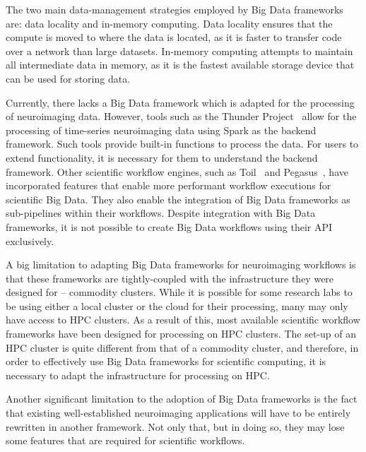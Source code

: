         The two main data-management strategies employed by Big Data frameworks
        are: data locality and in-memory computing. Data locality ensures that
        the compute is moved to where the data is located, as it is faster to
        transfer code over a network than large datasets. In-memory computing attempts
        to maintain all intermediate data in memory, as it is the fastest available storage
        device that can be used for storing data.

        Currently, there lacks a Big Data framework which is adapted for the
        processing of neuroimaging data. However, tools such as the Thunder 
        Project~\cite{Freeman:2014aa} allow for the processing of time-series
        neuroimaging data using Spark as the backend framework. Such tools
        provide built-in functions to process the data. For users to 
        extend functionality, it is necessary for them to understand the 
        backend framework. Other scientific workflow engines, such as 
        Toil~\cite{Vivian:2017aa} and Pegasus~\cite{DEELMAN201517}, have 
        incorporated features that enable more 
        performant workflow executions for scientific Big Data. They also enable
        the integration of Big Data frameworks as sub-pipelines within their 
        workflows. Despite integration with Big Data frameworks, it is not
        possible to create Big Data workflows using their API exclusively.

        A big limitation to adapting Big Data frameworks for neuroimaging 
        workflows is that these frameworks are tightly-coupled with the 
        infrastructure they were designed for -- commodity clusters. While
        it is possible for some research labs to be using either a local cluster
        or the cloud for their processing, many may only have access to HPC
        clusters. As a result of this, most available scientific workflow 
        frameworks have been designed for processing on HPC clusters. The 
        set-up of an HPC cluster is quite different from that of a commodity 
        cluster, and therefore, in order to effectively use Big Data frameworks
        for scientific computing, it is necessary to adapt the infrastructure 
        for processing on HPC.

        Another significant limitation to the adoption of Big Data frameworks is
        the fact that existing well-established neuroimaging applications will have
        to be entirely rewritten in another framework. Not only that, but in doing so,
        they may lose some features that are required for scientific workflows.


